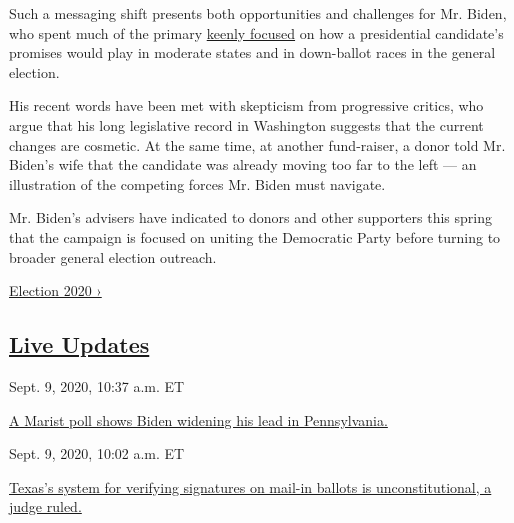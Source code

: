 Such a messaging shift presents both opportunities and challenges for
Mr. Biden, who spent much of the primary
\href{https://www.nytimes3xbfgragh.onion/2019/12/18/us/politics/joe-biden-2020-polls.html}{keenly
focused} on how a presidential candidate's promises would play in
moderate states and in down-ballot races in the general election.

His recent words have been met with skepticism from progressive critics,
who argue that his long legislative record in Washington suggests that
the current changes are cosmetic. At the same time, at another
fund-raiser, a donor told Mr. Biden's wife that the candidate was
already moving too far to the left --- an illustration of the competing
forces Mr. Biden must navigate.

Mr. Biden's advisers have indicated to donors and other supporters this
spring that the campaign is focused on uniting the Democratic Party
before turning to broader general election outreach.

\href{https://www.nytimes3xbfgragh.onion/news-event/2020-election}{Election
2020 ›}

\hypertarget{live-updates}{%
\subsection{\texorpdfstring{\href{https://www.nytimes3xbfgragh.onion/live/2020/09/09/us/trump-vs-biden}{Live
Updates}}{Live Updates}}\label{live-updates}}

\href{https://www.nytimes3xbfgragh.onion/live/2020/09/09/us/trump-vs-biden\#a-marist-poll-shows-biden-widening-his-lead-in-pennsylvania}{}

Sept. 9, 2020, 10:37 a.m. ET

\href{https://www.nytimes3xbfgragh.onion/live/2020/09/09/us/trump-vs-biden\#a-marist-poll-shows-biden-widening-his-lead-in-pennsylvania}{A
Marist poll shows Biden widening his lead in
Pennsylvania.}\href{https://www.nytimes3xbfgragh.onion/live/2020/09/09/us/trump-vs-biden\#texass-system-for-verifying-signatures-on-mail-in-ballots-is-unconstitutional-a-judge-ruled}{}

Sept. 9, 2020, 10:02 a.m. ET

\href{https://www.nytimes3xbfgragh.onion/live/2020/09/09/us/trump-vs-biden\#texass-system-for-verifying-signatures-on-mail-in-ballots-is-unconstitutional-a-judge-ruled}{Texas's
system for verifying signatures on mail-in ballots is unconstitutional,
a judge
ruled.}\href{https://www.nytimes3xbfgragh.onion/live/2020/09/09/us/trump-vs-biden\#democrats-worry-about-a-partisan-slant-at-the-postal-service-where-trump-allies-dominate-the-board}{}

